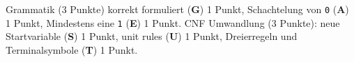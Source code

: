 \begin{bewertung}
Grammatik (3 Punkte) korrekt formuliert ({\bf G}) 1 Punkt,
Schachtelung von \texttt{0} ({\bf A}) 1 Punkt,
Mindestens eine \texttt{1} ({\bf E}) 1 Punkt.
CNF Umwandlung (3 Punkte): neue Startvariable ({\bf S}) 1 Punkt,
unit rules ({\bf U}) 1 Punkt,
Dreierregeln und Terminalsymbole ({\bf T}) 1 Punkt.
\end{bewertung}
